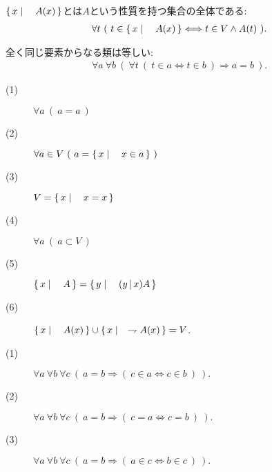 	
	\begin{screen}
		\begin{axm}[類の公理]
			$\left\{\, x \mid \quad A(x)\, \right\}$とは$A$という性質を持つ集合の全体である:
			\begin{align}
				\forall t\ (\ t \in \left\{\, x \mid \quad A(x)\, \right\} \Longleftrightarrow t \in V \wedge A(t)\ ).
			\end{align}
		\end{axm}
	\end{screen}
	
	\begin{screen}
		\begin{axm}[外延性の公理]
			全く同じ要素からなる類は等しい:
			\begin{align}
				\forall a\ \forall b\ \left(\ \forall t\ (\ t \in a  \Longleftrightarrow t \in b\ )
				\Longrightarrow a=b\ \right).
			\end{align}
		\end{axm}
	\end{screen}
	
	\begin{screen}
		\begin{thm}\mbox{}
			\begin{description}
				\item[(1)] $\forall a\ (\ a=a\ )$
				\item[(2)] $\forall a \in V\ (\ a = \Set{x}{x \in a}\ )$
				\item[(3)] $V=\left\{\, x \mid \quad x=x\, \right\}$
				\item[(4)] $\forall a\ (\ a \subset V\ )$
				\item[(5)] $\left\{\, x \mid \quad A\, \right\} = \left\{\, y \mid \quad (y\, |\, x)A\, \right\}$
				\item[(6)] $\left\{\, x \mid \quad A(x)\, \right\} \cup \left\{\, x \mid \quad \rightharpoondown A(x)\, \right\} = V$.
			\end{description}
		\end{thm}
	\end{screen}
	
	\begin{screen}
		\begin{axm}[相等性の公理]\mbox{}
			\begin{description}
				\item[(1)] $\forall a\ \forall b\ \forall c\ \left(\ a=b \Longrightarrow (\ c \in a \Longleftrightarrow c \in b\ )\ \right).$
				\item[(2)] $\forall a\ \forall b\ \forall c\ \left(\ a=b \Longrightarrow (\ c = a \Longleftrightarrow c = b\ )\ \right).$
				\item[(3)] $\forall a\ \forall b\ \forall c\ \left(\ a=b \Longrightarrow (\ a \in c \Longleftrightarrow b \in c\ )\ \right).$
			\end{description}
		\end{axm}
	\end{screen}
	
